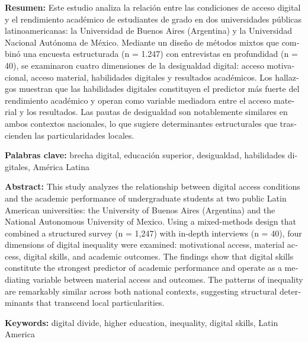 \documentclass{article}
\begin{document}
\begin{tcolorbox}[colback=brown!8!white,colframe=brown!8!white,boxrule=0pt,arc=2pt,left=4pt,right=4pt,top=3pt,bottom=3pt,before skip=4pt,after skip=4pt]
\begin{otherlanguage}{spanish}
\sffamily\small \textbf{Resumen:} Este estudio analiza la relación entre las condiciones de acceso digital y el rendimiento académico de estudiantes de grado en dos universidades públicas latinoamericanas: la Universidad de Buenos Aires (Argentina) y la Universidad Nacional Autónoma de México. Mediante un diseño de métodos mixtos que combinó una encuesta estructurada (n = 1.247) con entrevistas en profundidad (n = 40), se examinaron cuatro dimensiones de la desigualdad digital: acceso motivacional, acceso material, habilidades digitales y resultados académicos. Los hallazgos muestran que las habilidades digitales constituyen el predictor más fuerte del rendimiento académico y operan como variable mediadora entre el acceso material y los resultados. Las pautas de desigualdad son notablemente similares en ambos contextos nacionales, lo que sugiere determinantes estructurales que trascienden las particularidades locales.
\par\smallskip\noindent\textbf{Palabras clave:} brecha digital, educación superior, desigualdad, habilidades digitales, América Latina
\end{otherlanguage}
\end{tcolorbox}

\begin{tcolorbox}[colback=brown!8!white,colframe=brown!8!white,boxrule=0pt,arc=2pt,left=4pt,right=4pt,top=3pt,bottom=3pt,before skip=4pt,after skip=4pt]
\begin{otherlanguage}{english}
\sffamily\small \textbf{Abstract:} This study analyzes the relationship between digital access conditions and the academic performance of undergraduate students at two public Latin American universities: the University of Buenos Aires (Argentina) and the National Autonomous University of Mexico. Using a mixed-methods design that combined a structured survey (n = 1,247) with in-depth interviews (n = 40), four dimensions of digital inequality were examined: motivational access, material access, digital skills, and academic outcomes. The findings show that digital skills constitute the strongest predictor of academic performance and operate as a mediating variable between material access and outcomes. The patterns of inequality are remarkably similar across both national contexts, suggesting structural determinants that transcend local particularities.
\par\smallskip\noindent\textbf{Keywords:} digital divide, higher education, inequality, digital skills, Latin America
\end{otherlanguage}
\end{tcolorbox}
\end{document}

